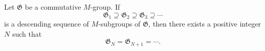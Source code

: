 Let $\mathfrak{G}$ be a commutative $M$-group. If
\[
\mathfrak{G}_1 \supseteq \mathfrak{G}_2 \supseteq \mathfrak{G}_3 \supseteq \cdots
\]
is a descending sequence of $M$-subgroups of $\mathfrak{G}$, then there exists a positive integer $N$ such that
\[
\mathfrak{G}_N = \mathfrak{G}_{N+1} = \cdots.
\]
